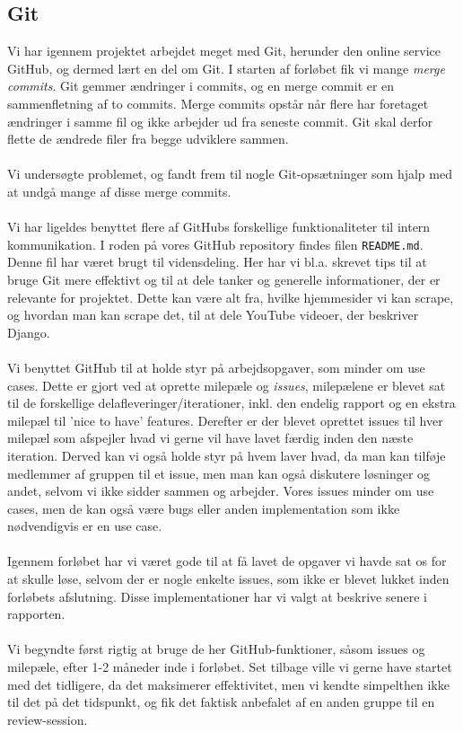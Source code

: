 \documentclass[12pt]{article}
\begin{document}
\subsection{Git}
\label{sec:git}
Vi har igennem projektet arbejdet meget med Git, herunder den online service GitHub, og dermed lært en del om Git. I starten af forløbet fik vi mange \textit{merge commits}. Git gemmer ændringer i commits, og en merge commit er en sammenfletning af to commits. Merge commits opstår når flere har foretaget ændringer i samme fil og ikke arbejder ud fra seneste commit. Git skal derfor flette de ændrede filer fra begge udviklere sammen.\\
\\
Vi undersøgte problemet, og fandt frem til nogle Git-opsætninger som hjalp med at undgå mange af disse merge commits.\cite{mergecommits}\\
\\
Vi har ligeldes benyttet flere af GitHubs forskellige funktionaliteter til intern kommunikation. I roden på vores GitHub repository findes filen \texttt{README.md}. Denne fil har været brugt til vidensdeling.
Her har vi bl.a. skrevet tips til at bruge Git mere effektivt og til at dele tanker og generelle informationer, der er relevante for projektet. Dette kan være alt fra, hvilke hjemmesider vi kan scrape, og hvordan man kan scrape det, til at dele YouTube videoer, der beskriver Django. \\ \\
Vi benyttet GitHub til at holde styr på arbejdsopgaver, som minder om use cases. Dette er gjort ved at oprette milepæle og \textit{issues}, milepælene er blevet sat til de forskellige delafleveringer/iterationer, inkl. den endelig rapport og en ekstra milepæl til 'nice to have' features. Derefter er der blevet oprettet issues til hver milepæl som afspejler hvad vi gerne vil have lavet færdig inden den næste iteration. Derved kan vi også holde styr på hvem laver hvad, da man kan tilføje medlemmer af gruppen til et issue, men man kan også diskutere løsninger og andet, selvom vi ikke sidder sammen og arbejder.
Vores issues minder om use cases, men de kan også være bugs eller anden implementation som ikke nødvendigvis er en use case. \\
\\
Igennem forløbet har vi været gode til at få lavet de opgaver vi havde sat os for at skulle løse, selvom der er nogle enkelte issues, som ikke er blevet lukket inden forløbets afslutning. Disse implementationer har vi valgt at beskrive senere i rapporten. \\ \\
Vi begyndte først rigtig at bruge de her GitHub-funktioner, såsom issues og milepæle, efter 1-2 måneder inde i forløbet. Set tilbage ville vi gerne have startet med det tidligere, da det maksimerer effektivitet, men vi kendte simpelthen ikke til det på det tidspunkt, og fik det faktisk anbefalet af en anden gruppe til en review-session.
\end{document}
